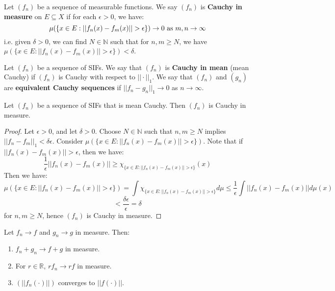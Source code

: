 	\begin{definition}
		Let $(f_n)$ be a sequence of measurable functions. We say $(f_n)$ is \textbf{Cauchy in measure} on $E\subseteq 
		X$ if for each $\epsilon > 0$, we have:
		$$
			\mu(\{x\in E : ||f_n(x) - f_m(x)|| > \epsilon\})\rightarrow 0\textnormal{ as } m, n\rightarrow\infty
		$$
		i.e. given $\delta > 0$, we can find $N\in\mathbb N$ such that for $n, m\geq N$, we have $\mu(\{x\in E : ||f_n(x) 
		- f_m(x)|| > \epsilon\}) < \delta$. 
	\end{definition}
	
	\begin{definition}
		Let $(f_n)$ be a sequence of SIFs. We say that $(f_n)$ is \textbf{Cauchy in mean} (mean Cauchy) if $(f_n)$ is 
		Cauchy with respect to $||\cdot||_1$. We say that $(f_n)$ and $(g_n)$ are \textbf{equivalent Cauchy sequences} 
		if $||f_n - g_n||_1\rightarrow 0$ as $n\rightarrow\infty$. 
	\end{definition}
	
	\begin{prop}
		Let $(f_n)$ be a sequence of SIFs that is mean Cauchy. Then $(f_n)$ is Cauchy in measure. 
	\end{prop}
	
	\begin{proof}
		Let $\epsilon > 0$, and let $\delta > 0$. Choose $N\in\mathbb N$ such that $n, m\geq N$ implies $||f_n - f_m||_1 < 
		\delta\epsilon$. Consider $\mu(\{x\in E : ||f_n(x) - f_m(x)|| > \epsilon\})$. Note that if $||f_n(x) - f_m(x)|| > \epsilon$, 
		then we have:
		$$
			\frac{1}{\epsilon}||f_n(x) - f_m(x)|| \geq\chi_{\{x\in E : ||f_n(x) - f_m(x)|| > \epsilon\}}(x)
		$$
		Then we have:
		$$
			\mu({\{x\in E : ||f_n(x) - f_m(x)|| > \epsilon\}}) = \int \chi_{\{x\in E : ||f_n(x) - f_m(x)|| > \epsilon\}}d\mu
			\leq\frac{1}{\epsilon}\int||f_n(x) - f_m(x)||d\mu(x)
		$$
		$$
			 < \frac{\delta\epsilon}{\epsilon} = \delta
		$$
		for $n, m\geq N$, hence $(f_n)$ is Cauchy in measure.
	\end{proof}
	
	\begin{prop}
		Let $f_n\rightarrow f$ and $g_n\rightarrow g$ in measure. Then:
		\begin{enumerate}
			\item $f_n + g_n\rightarrow f + g$ in measure. 
			\item For $r\in\mathbb R$, $rf_n\rightarrow rf$ in measure. 
			\item $(||f_n(\cdot)||)$ converges to $||f(\cdot)||$. 
		\end{enumerate}
	\end{prop}
	
